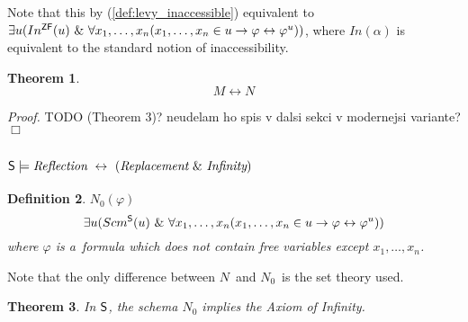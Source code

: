 \documentclass[12pt,a4paper]{article}
\newtheorem{theorem}{Theorem}[section]
\newtheorem{definition}[theorem]{Definition}
\newenvironment{proof}
{\noindent \textit{Proof.}}
{\hspace*{\fill} $\Box$}
\renewcommand{\iff}{\leftrightarrow}
\newcommand{\then}{\rightarrow}
\begin{document}
Note that this by (\ref{def:levy_inaccessible}) equivalent to $\exists u (In^{\sf{ZF}}(u)\ \&\ \forall x_1, \ldots , x_n (x_1, \ldots , x_n \in u \then \varphi \iff \varphi^{u}))$, where $In(\alpha)$ is equivalent to the standard notion of inaccessibility.

\begin{theorem}\label{theorem:levy_m_iff_n}
\begin{equation}
M \iff N
\end{equation}
\end{theorem}

\begin{proof}
TODO (Theorem 3)? neudelam ho spis v dalsi sekci v modernejsi variante?
\end{proof}

\subsection{$\sf{S} \models \emph{Reflection}\ \iff\ (\emph{Replacement}\ \&\ \emph{Infinity})$} 

\begin{definition}{$N_0(\varphi)$}
\begin{equation}
\exists u (Scm^{\sf{S}}(u)\ \&\ \forall x_1, \ldots , x_n (x_1, \ldots , x_n \in u \then \varphi \iff \varphi^{u}))
\end{equation}
where $\varphi$ is a~formula which does not contain free variables except $x_1, \ldots , x_n$.
\end{definition}

Note that the only difference between $N$ and $N_0$ is the set theory used.

\begin{theorem}
In $\sf{S}$, the schema $N_0$ implies the Axiom of Infinity.
\end{theorem}
\end{document}

